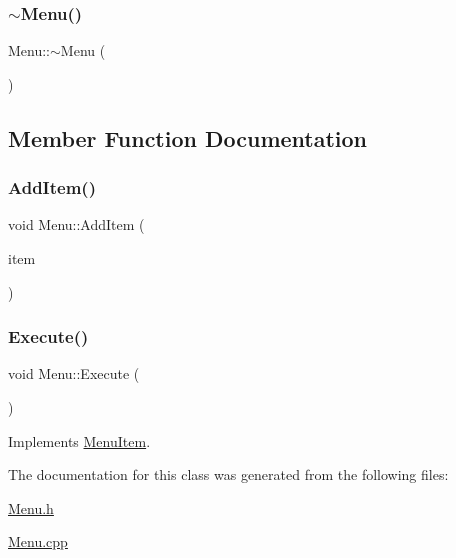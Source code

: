\mbox{\label{class_menu_a831387f51358cfb88cd018e1777bc980}} 
\subsubsection{\texorpdfstring{$\sim$\+Menu()}{~Menu()}}
{\footnotesize\ttfamily Menu\+::$\sim$\+Menu (\begin{DoxyParamCaption}{ }\end{DoxyParamCaption})}



\subsection{Member Function Documentation}
\mbox{\label{class_menu_aa64e794ec331677883f6be3ec0e0eb5f}} 
\subsubsection{\texorpdfstring{Add\+Item()}{AddItem()}}
{\footnotesize\ttfamily void Menu\+::\+Add\+Item (\begin{DoxyParamCaption}\item[{\hyperlink{class_menu_item}{Menu\+Item} $\ast$}]{item }\end{DoxyParamCaption})}

\mbox{\label{class_menu_a0be077217ae2c0735bd148e8359be21b}} 
\subsubsection{\texorpdfstring{Execute()}{Execute()}}
{\footnotesize\ttfamily void Menu\+::\+Execute (\begin{DoxyParamCaption}\item[{void}]{ }\end{DoxyParamCaption})\hspace{0.3cm}{\ttfamily [virtual]}}



Implements \hyperlink{class_menu_item_a08f0695dbfdad36bc9aab7597df02a00}{Menu\+Item}.



The documentation for this class was generated from the following files\+:\begin{DoxyCompactItemize}
\item 
\hyperlink{_menu_8h}{Menu.\+h}\item 
\hyperlink{_menu_8cpp}{Menu.\+cpp}\end{DoxyCompactItemize}
